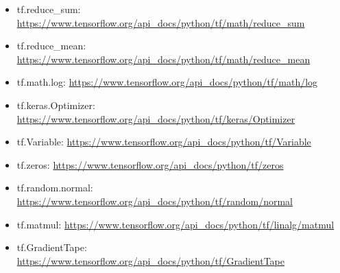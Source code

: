 \documentclass[11pt, a4paper]{article}
\begin{document}
\begin{itemize}
	\item tf.reduce\_sum: \url{https://www.tensorflow.org/api_docs/python/tf/math/reduce_sum}
	\item tf.reduce\_mean: \url{https://www.tensorflow.org/api_docs/python/tf/math/reduce_mean}
	\item tf.math.log: \url{https://www.tensorflow.org/api_docs/python/tf/math/log}
	\item tf.keras.Optimizer: \url{https://www.tensorflow.org/api_docs/python/tf/keras/Optimizer}
	\item tf.Variable: \url{https://www.tensorflow.org/api_docs/python/tf/Variable}
	\item tf.zeros: \url{https://www.tensorflow.org/api_docs/python/tf/zeros}
	\item tf.random.normal: \url{https://www.tensorflow.org/api_docs/python/tf/random/normal}
	\item tf.matmul: \url{https://www.tensorflow.org/api_docs/python/tf/linalg/matmul}
	\item tf.GradientTape: \url{https://www.tensorflow.org/api_docs/python/tf/GradientTape}
	
\end{itemize}
\end{document}
